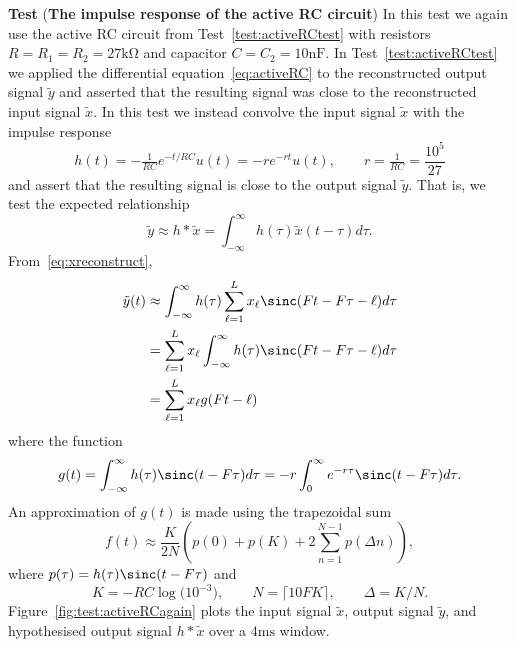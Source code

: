 \documentclass[11pt,a4paper]{book}
\theoremstyle{plain}
\numberwithin{equation}{section}
\newcommand{\ceil}[1]{\lceil #1 \rceil}
\newcounter{test}
\newenvironment{test}{
\begin{shaded}\refstepcounter{test}\par\noindent%
\textbf{Test \thetest}
}{
\end{shaded}
}
\newenvironment{randomfloat}{
\begin{figure}
}{
\end{figure}
\addtocounter{figure}{-1}
}
\begin{document}
\begin{test}\label{test:activeRCtestagain} 
(\textbf{The impulse response of the active RC circuit})
In this test we again use the active RC circuit from Test~\ref{test:activeRCtest} with resistors $R=R_1=R_2=27\si{\kilo\ohm}$ and capacitor $C=C_2=10\si{\nano\farad}$.  In Test~\ref{test:activeRCtest} we applied the differential equation~\eqref{eq:activeRC} to the reconstructed output signal $\tilde{y}$ and asserted that the resulting signal was close to the reconstructed input signal $\tilde{x}$.  In this test we instead convolve the input signal $\tilde{x}$ with the impulse response 
\[
h(t) = -\tfrac{1}{RC} e^{-t/RC}u(t) = -r e^{-rt}u(t), \qquad r = \tfrac{1}{RC} = \frac{10^5}{27}
\] 
and assert that the resulting signal is close to the output signal $\tilde{y}$.  That is, we test the expected relationship
\[
\tilde{y} \approx h * \tilde{x} = \int_{-\infty}^\infty h(\tau) \tilde{x}(t - \tau) d\tau.
\]
From~\eqref{eq:xreconstruct},
\begin{align*}
\tilde{y}(t) &\approx  \int_{-\infty}^{\infty} h(\tau) \sum_{\ell=1}^L x_\ell \sinc( Ft - F\tau - \ell ) d\tau \\
&= \sum_{\ell=1}^L  x_\ell \int_{-\infty}^{\infty} h(\tau) \sinc( Ft - F\tau - \ell ) d\tau \\
&= \sum_{\ell=1}^L  x_\ell g( Ft - \ell )
\end{align*}
where the function
\[
g(t) = \int_{-\infty}^\infty h(\tau) \sinc( t - F\tau ) d\tau = -r \int_{0}^\infty e^{-r\tau} \sinc( t - F\tau ) d\tau.
\]
An approximation of $g(t)$ is made using the trapezoidal sum
\[
f(t) \approx \frac{K}{2N} \left( p(0) + p(K) + 2 \sum_{n=1}^{N-1} p( \Delta n ) \right),
\]
where $p(\tau) = h(\tau) \sinc( t - F\tau )$ and
\[
K = -RC\log\big(10^{-3}\big), \qquad N = \ceil{10 F K}, \qquad \Delta = K/N.
\]
Figure~\ref{fig:test:activeRCagain} plots the input signal $\tilde{x}$, output signal $\tilde{y}$, and hypothesised output signal $h * \tilde{x}$ over a $4\si{\milli\second}$ window.


\end{test}
\end{document}
